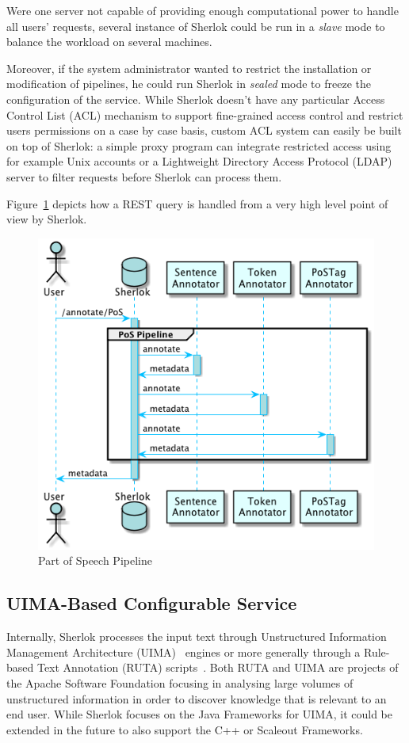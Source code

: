 \documentclass{article}
\begin{document}
Were one server not capable of providing enough computational power to handle all users' requests,
several instance of Sherlok could be run in a \emph{slave} mode to balance the workload on several
machines.

Moreover, if the system administrator wanted to restrict the installation or modification of
pipelines, he could run Sherlok in \emph{sealed} mode to freeze the configuration of the service.
While Sherlok doesn't have any particular Access Control List (ACL) mechanism to support
fine-grained access control and restrict users permissions on a case by case basis, custom ACL
system can easily be built on top of Sherlok: a simple proxy program can integrate restricted access
using for example Unix accounts or a Lightweight Directory Access Protocol (LDAP) server to filter
requests before Sherlok can process them.

Figure~\ref{fig:sherlok_basic_rest_call} depicts how a REST query is handled from a very high level
point of view by Sherlok.

\begin{figure}
    \centering
    \includegraphics[width=0.7\linewidth]{res/sherlok_basic_rest_call.png}
    \caption{Part of Speech Pipeline}
    \label{fig:sherlok_basic_rest_call}
\end{figure}

\subsection{UIMA-Based Configurable Service}

Internally, Sherlok processes the input text through Unstructured Information Management
Architecture (UIMA)~\cite{uima} engines or more generally through a Rule-based Text Annotation
(RUTA) scripts~\cite{ruta}. Both RUTA and UIMA are projects of the Apache Software Foundation
\cite{apachefundation} focusing in analysing large volumes of unstructured information in order to
discover knowledge that is relevant to an end user. While Sherlok focuses on the Java Frameworks for
UIMA, it could be extended in the future to also support the C++ or Scaleout Frameworks.
\end{document}
